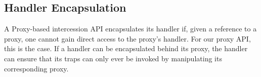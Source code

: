 \documentclass{sig-alternate}
\begin{document}





\subsection{Handler Encapsulation}
\label{sub:meta_level_encapsulation}

A Proxy-based intercession API encapsulates its handler if, given a reference to a proxy, one cannot gain direct access to the proxy's handler. For our proxy API, this is the case. If a handler can be encapsulated behind its proxy, the handler can ensure that its traps can only ever be invoked by manipulating its corresponding proxy.
\end{document}
